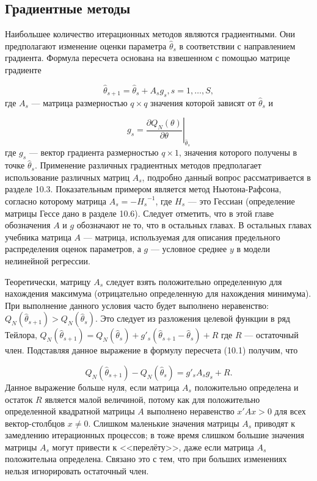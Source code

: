 \subsection{Градиентные методы}

Наибольшее количество итерационных методов являются градиентными. Они предполагают изменение оценки параметра $\hat{\theta}_s$ в соответствии с направлением градиента. Формула пересчета основана на взвешенном с помощью матрице градиенте

\begin{equation}
\hat{\theta}_{s+1}=\hat{\theta}_{s}+A_{s}g_{s}, s=1,\ldots ,S,
\end{equation}
где $A_s$ --- матрица размерностью $q \times q$ значения которой зависят от $\hat{\theta}_s$ и

\begin{equation}
g_s=\left. \dfrac{\partial{Q_N}{(\theta)}}{\partial\theta}\right|_{\hat{\theta}_{s}}
\end{equation}
где $g_s$ --- вектор градиента размерностью $q \times 1$, значения которого получены в точке $\hat{\theta}_s$. Применение различных градиентных методов предполагает использование различных матриц $A_s$, подробно данный вопрос рассматривается в разделе 10.3. Показательным примером является метод Ньютона-Рафсона, согласно которому матрица $A_s=-{H_s}^{-1}$, где $H_s$ --- это Гессиан (определение матрицы Гессе дано в разделе 10.6). Следует отметить, что в  этой главе обозначения $A$ и $g$ обозначают не то, что в остальных главах.  В остальных главах учебника матрица $A$ --- матрица, используемая для описания предельного распределения оценок параметров, а $g$ --- условное среднее  $y$ в модели нелинейной регрессии.

Теоретически,  матрицу $A_s$ следует взять положительно определенную для нахождения максимума (отрицательно определенную для нахождения минимума). При выполнение данного условия часто будет выполнено неравенство: $Q_N(\hat{\theta}_{s+1})>Q_N({\hat{\theta}}_s)$. Это следует из разложения целевой функции в ряд Тейлора, $Q_N(\hat{\theta}_{s+1})=Q_N(\hat{\theta}_s)+g'_s(\hat{\theta}_{s+1}-\hat{\theta}_s)+R$  где $R$ --- остаточный член. Подставляя данное выражение в формулу пересчета (10.1) получим, что

\[
Q_N(\hat{\theta}_{s+1})-Q_N(\hat{\theta}_s)=g'_sA_sg_s+R.
\]
Данное выражение больше нуля, если матрица $A_s$ положительно определена и остаток $R$ является малой величиной, потому как для положительно определенной квадратной матрицы $A$ выполнено неравенство $x'Ax>0$ для всех вектор-столбцов $x\neq0$. Слишком маленькие значения матрицы $A_s$ приводят к замедлению итерационных процессов; в тоже время слишком большие значения матрицы $A_s$ могут привести к <<перелёту>>, даже если матрица $A_s$ положительна определена. Связано это с тем, что при больших изменениях нельзя игнорировать остаточный член.

